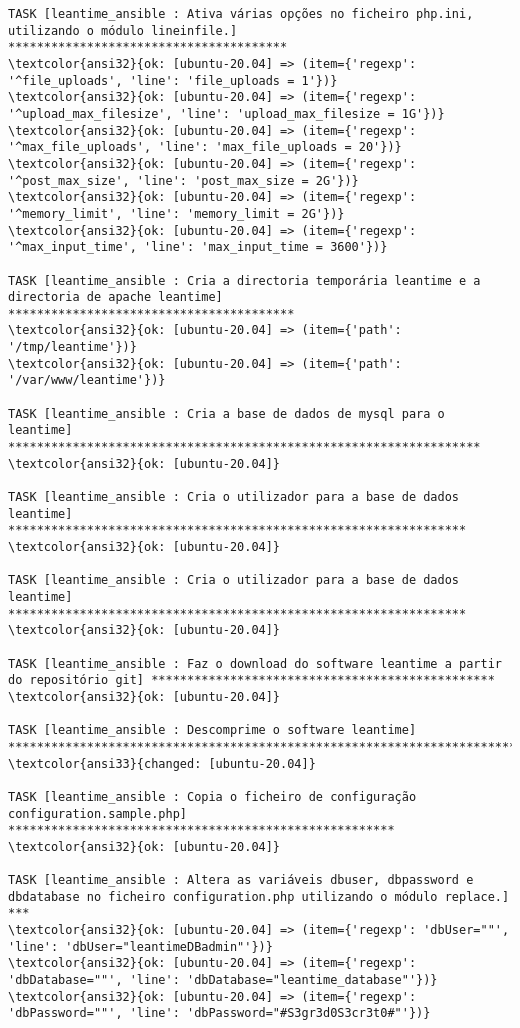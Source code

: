 \documentclass{scrartcl}
\begin{document}
\begin{Verbatim}
TASK [leantime_ansible : Ativa várias opções no ficheiro php.ini, utilizando o módulo lineinfile.] ***************************************
\textcolor{ansi32}{ok: [ubuntu-20.04] => (item={'regexp': '^file_uploads', 'line': 'file_uploads = 1'})}
\textcolor{ansi32}{ok: [ubuntu-20.04] => (item={'regexp': '^upload_max_filesize', 'line': 'upload_max_filesize = 1G'})}
\textcolor{ansi32}{ok: [ubuntu-20.04] => (item={'regexp': '^max_file_uploads', 'line': 'max_file_uploads = 20'})}
\textcolor{ansi32}{ok: [ubuntu-20.04] => (item={'regexp': '^post_max_size', 'line': 'post_max_size = 2G'})}
\textcolor{ansi32}{ok: [ubuntu-20.04] => (item={'regexp': '^memory_limit', 'line': 'memory_limit = 2G'})}
\textcolor{ansi32}{ok: [ubuntu-20.04] => (item={'regexp': '^max_input_time', 'line': 'max_input_time = 3600'})}

TASK [leantime_ansible : Cria a directoria temporária leantime e a directoria de apache leantime] ****************************************
\textcolor{ansi32}{ok: [ubuntu-20.04] => (item={'path': '/tmp/leantime'})}
\textcolor{ansi32}{ok: [ubuntu-20.04] => (item={'path': '/var/www/leantime'})}

TASK [leantime_ansible : Cria a base de dados de mysql para o leantime] ******************************************************************
\textcolor{ansi32}{ok: [ubuntu-20.04]}

TASK [leantime_ansible : Cria o utilizador para a base de dados leantime] ****************************************************************
\textcolor{ansi32}{ok: [ubuntu-20.04]}

TASK [leantime_ansible : Cria o utilizador para a base de dados leantime] ****************************************************************
\textcolor{ansi32}{ok: [ubuntu-20.04]}

TASK [leantime_ansible : Faz o download do software leantime a partir do repositório git] ************************************************
\textcolor{ansi32}{ok: [ubuntu-20.04]}

TASK [leantime_ansible : Descomprime o software leantime] ********************************************************************************
\textcolor{ansi33}{changed: [ubuntu-20.04]}

TASK [leantime_ansible : Copia o ficheiro de configuração configuration.sample.php] ******************************************************
\textcolor{ansi32}{ok: [ubuntu-20.04]}

TASK [leantime_ansible : Altera as variáveis dbuser, dbpassword e dbdatabase no ficheiro configuration.php utilizando o módulo replace.] ***
\textcolor{ansi32}{ok: [ubuntu-20.04] => (item={'regexp': 'dbUser=""', 'line': 'dbUser="leantimeDBadmin"'})}
\textcolor{ansi32}{ok: [ubuntu-20.04] => (item={'regexp': 'dbDatabase=""', 'line': 'dbDatabase="leantime_database"'})}
\textcolor{ansi32}{ok: [ubuntu-20.04] => (item={'regexp': 'dbPassword=""', 'line': 'dbPassword="#S3gr3d0S3cr3t0#"'})}


\end{Verbatim}
\end{document}
